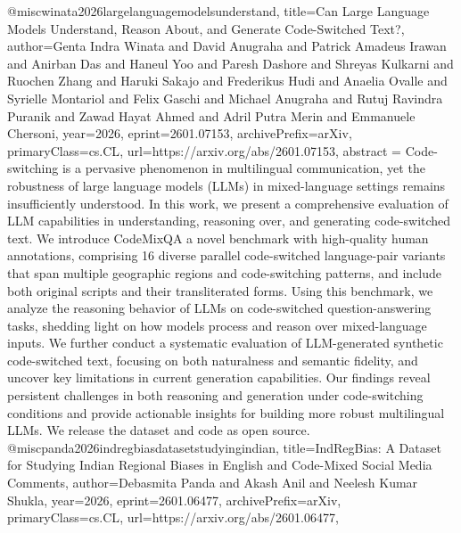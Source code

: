 {}@misc{winata2026largelanguagemodelsunderstand,
      title={Can Large Language Models Understand, Reason About, and Generate Code-Switched Text?}, 
      author={Genta Indra Winata and David Anugraha and Patrick Amadeus Irawan and Anirban Das and Haneul Yoo and Paresh Dashore and Shreyas Kulkarni and Ruochen Zhang and Haruki Sakajo and Frederikus Hudi and Anaelia Ovalle and Syrielle Montariol and Felix Gaschi and Michael Anugraha and Rutuj Ravindra Puranik and Zawad Hayat Ahmed and Adril Putra Merin and Emmanuele Chersoni},
      year={2026},
      eprint={2601.07153},
      archivePrefix={arXiv},
      primaryClass={cs.CL},
      url={https://arxiv.org/abs/2601.07153},
      abstract = {Code-switching is a pervasive phenomenon in multilingual communication, yet the robustness of large language models (LLMs) in mixed-language settings remains insufficiently understood. In this work, we present a comprehensive evaluation of LLM capabilities in understanding, reasoning over, and generating code-switched text. We introduce CodeMixQA a novel benchmark with high-quality human annotations, comprising 16 diverse parallel code-switched language-pair variants that span multiple geographic regions and code-switching patterns, and include both original scripts and their transliterated forms. Using this benchmark, we analyze the reasoning behavior of LLMs on code-switched question-answering tasks, shedding light on how models process and reason over mixed-language inputs. We further conduct a systematic evaluation of LLM-generated synthetic code-switched text, focusing on both naturalness and semantic fidelity, and uncover key limitations in current generation capabilities. Our findings reveal persistent challenges in both reasoning and generation under code-switching conditions and provide actionable insights for building more robust multilingual LLMs. We release the dataset and code as open source.}
}@misc{panda2026indregbiasdatasetstudyingindian,
      title={IndRegBias: A Dataset for Studying Indian Regional Biases in English and Code-Mixed Social Media Comments}, 
      author={Debasmita Panda and Akash Anil and Neelesh Kumar Shukla},
      year={2026},
      eprint={2601.06477},
      archivePrefix={arXiv},
      primaryClass={cs.CL},
      url={https://arxiv.org/abs/2601.06477},
}
